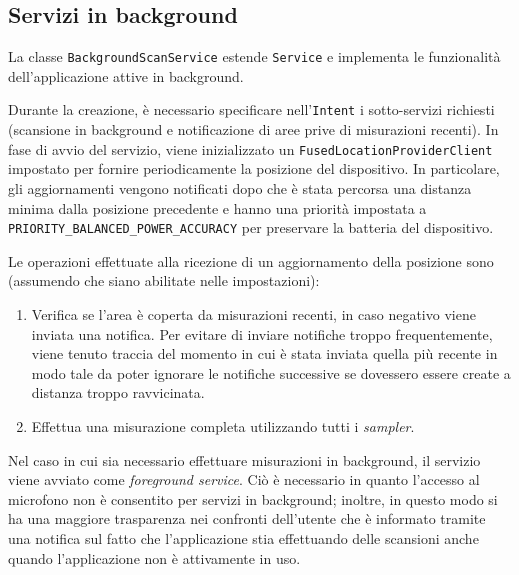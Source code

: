 \subsection{Servizi in background}
La classe \texttt{BackgroundScanService} estende \texttt{Service} e implementa le funzionalità dell'applicazione attive in background.

Durante la creazione, è necessario specificare nell'\texttt{Intent} i sotto-servizi richiesti (scansione in background e notificazione di aree prive di misurazioni recenti).
In fase di avvio del servizio, viene inizializzato un \texttt{FusedLocationProviderClient} impostato per fornire periodicamente la posizione del dispositivo. In particolare, gli aggiornamenti vengono notificati dopo che è stata percorsa una distanza minima dalla posizione precedente e hanno una priorità impostata a \texttt{PRIORITY\_BALANCED\_POWER\_ACCURACY} per preservare la batteria del dispositivo.

Le operazioni effettuate alla ricezione di un aggiornamento della posizione sono (assumendo che siano abilitate nelle impostazioni):
\begin{enumerate}
  \item Verifica se l'area è coperta da misurazioni recenti, in caso negativo viene inviata una notifica.
        Per evitare di inviare notifiche troppo frequentemente, viene tenuto traccia del momento in cui è stata inviata quella più recente in modo tale da poter ignorare le notifiche successive se dovessero essere create a distanza troppo ravvicinata.
  \item Effettua una misurazione completa utilizzando tutti i \textit{sampler}.
\end{enumerate}

Nel caso in cui sia necessario effettuare misurazioni in background, il servizio viene avviato come  \textit{foreground service}. Ciò è necessario in quanto l'accesso al microfono non è consentito per servizi in background; inoltre, in questo modo si ha una maggiore trasparenza nei confronti dell'utente che è informato tramite una notifica sul fatto che l'applicazione stia effettuando delle scansioni anche quando l'applicazione non è attivamente in uso.
